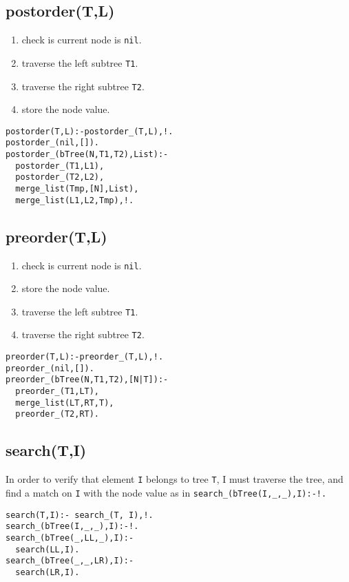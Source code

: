 \documentclass{article}
\begin{document}
  \subsection*{postorder(T,L)}
    \begin{enumerate}
      \item check is current node is \texttt{nil}.
      \item traverse the left subtree \texttt{T1}.
      \item traverse the right subtree \texttt{T2}.
      \item store the node value.
    \end{enumerate}

    \begin{verbatim}
postorder(T,L):-postorder_(T,L),!.
postorder_(nil,[]).
postorder_(bTree(N,T1,T2),List):-
  postorder_(T1,L1),
  postorder_(T2,L2),
  merge_list(Tmp,[N],List),
  merge_list(L1,L2,Tmp),!.
    \end{verbatim}

  \subsection*{preorder(T,L)}
    \begin{enumerate}
      \item check is current node is \texttt{nil}.
      \item store the node value.
      \item traverse the left subtree \texttt{T1}.
      \item traverse the right subtree \texttt{T2}.
    \end{enumerate}

    \begin{verbatim}
preorder(T,L):-preorder_(T,L),!.
preorder_(nil,[]).
preorder_(bTree(N,T1,T2),[N|T]):-
  preorder_(T1,LT),
  merge_list(LT,RT,T),
  preorder_(T2,RT).
    \end{verbatim}

  \subsection*{search(T,I)}
    In order to verify that element \texttt{I} belongs to tree
    \texttt{T}, I must traverse the tree, and find a match on
    \texttt{I} with the node value as in
    \texttt{search_(bTree(I,_,_),I):-!.}
    \begin{verbatim}
search(T,I):- search_(T, I),!.
search_(bTree(I,_,_),I):-!.
search_(bTree(_,LL,_),I):-
  search(LL,I).
search_(bTree(_,_,LR),I):-
  search(LR,I).
    \end{verbatim}
\end{document}
